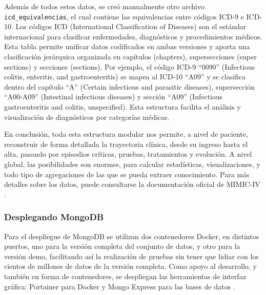 Además de todos estos datos, se creó manualmente otro archivo \texttt{icd\_equivalencias}, el cual contiene las equivalencias entre códigos ICD-9 e ICD-10. Los códigos ICD (International Classification of Diseases) son el estándar internacional para clasificar enfermedades, diagnósticos y procedimientos médicos. Esta tabla permite unificar datos codificados en ambas versiones y aporta una clasificación jerárquica organizada en capítulos (chapters), supersecciones (super sections) y secciones (sections). Por ejemplo, el código ICD-9 ``0090'' (Infectious colitis, enteritis, and gastroenteritis) se mapea al ICD-10 ``A09'' y se clasifica dentro del capítulo ``A'' (Certain infectious and parasitic diseases), supersección ``A00-A09'' (Intestinal infectious diseases) y sección ``A09'' (Infectious gastroenteritis and colitis, unspecified). Esta estructura facilita el análisis y visualización de diagnósticos por categorías médicas.

En conclusión, toda esta estructura modular nos permite, a nivel de paciente, reconstruir de forma detallada la trayectoria clínica, desde su ingreso hasta el alta, pasando por episodios críticos, pruebas, tratamientos y evolución. A nivel global, las posibilidades son enormes, para calcular estadísticas, visualizaciones, y todo tipo de agregaciones de las que se pueda extraer conocimiento. Para más detalles sobre los datos, puede consultarse la documentación oficial de MIMIC-IV \cite{MIMICIV_docs}.

\subsubsection{Desplegando MongoDB}

Para el despliegue de MongoDB se utilizan dos contenedores Docker, en distintos puertos, uno para la versión completa del conjunto de datos, y otro para la versión demo, facilitando así la realización de pruebas sin tener que lidiar con los cientos de millones de datos de la versión completa. Como apoyo al desarrollo, y también en forma de contenedores, se despliegan las herramientas de interfaz gráfica: Portainer para Docker \cite{portainer_ce} y Mongo Express para las bases de datos \cite{mongo_express}. 


